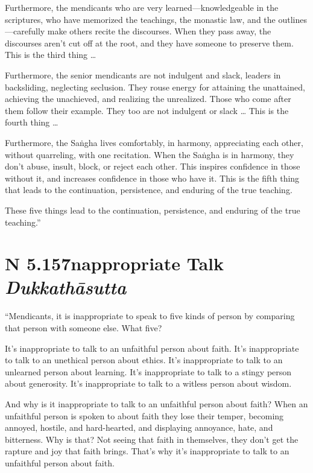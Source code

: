 \documentclass[12pt,openany]{book}%
\newcommand*{\suttatitleacronym}[1]{\smaller[2]{#1}\vspace*{.3em}}
\newcommand*{\suttatitletranslation}[1]{\linebreak{#1}}
\newcommand*{\suttatitleroot}[1]{\linebreak\smaller[2]\itshape{#1}}
\newcommand*{\tocacronym}[1]{\hspace*{-3.3em}{#1}\quad}
\newcommand*{\toctranslation}[1]{#1}
\newcommand*{\tocroot}[1]{(\textit{#1})}
\begin{document}
Furthermore, the mendicants who are very learned—knowledgeable in the scriptures, who have memorized the teachings, the monastic law, and the outlines—carefully make others recite the discourses. When they pass away, the discourses aren’t cut off at the root, and they have someone to preserve them. This is the third thing … 

Furthermore, the senior mendicants are not indulgent and slack, leaders in backsliding, neglecting seclusion. They rouse energy for attaining the unattained, achieving the unachieved, and realizing the unrealized. Those who come after them follow their example. They too are not indulgent or slack … This is the fourth thing … 

Furthermore, the \textsanskrit{Saṅgha} lives comfortably, in harmony, appreciating each other, without quarreling, with one recitation. When the \textsanskrit{Saṅgha} is in harmony, they don’t abuse, insult, block, or reject each other. This inspires confidence in those without it, and increases confidence in those who have it. This is the fifth thing that leads to the continuation, persistence, and enduring of the true teaching. 

These five things lead to the continuation, persistence, and enduring of the true teaching.” 

%
\section*{{\suttatitleacronym AN 5.157}{\suttatitletranslation Inappropriate Talk }{\suttatitleroot Dukkathāsutta}}
\addcontentsline{toc}{section}{\tocacronym{AN 5.157} \toctranslation{Inappropriate Talk } \tocroot{Dukkathāsutta}}

“Mendicants, it is inappropriate to speak to five kinds of person by comparing that person with someone else. What five? 

It’s inappropriate to talk to an unfaithful person about faith. It’s inappropriate to talk to an unethical person about ethics. It’s inappropriate to talk to an unlearned person about learning. It’s inappropriate to talk to a stingy person about generosity. It’s inappropriate to talk to a witless person about wisdom. 

And why is it inappropriate to talk to an unfaithful person about faith? When an unfaithful person is spoken to about faith they lose their temper, becoming annoyed, hostile, and hard-hearted, and displaying annoyance, hate, and bitterness. Why is that? Not seeing that faith in themselves, they don’t get the rapture and joy that faith brings. That’s why it’s inappropriate to talk to an unfaithful person about faith. 
\end{document}
